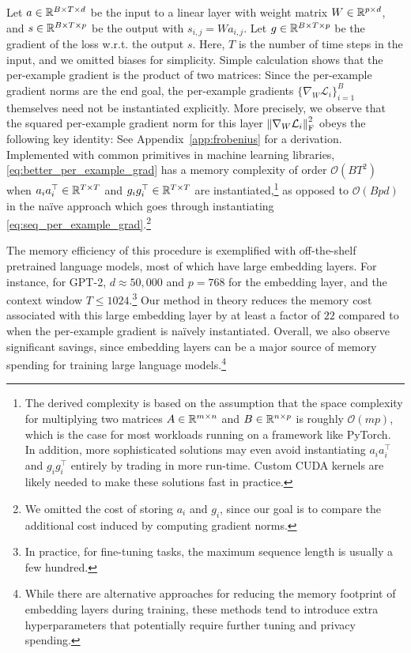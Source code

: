 Let $a \in \mathbb{R}^{B\times T \times d}$ be the input to a linear layer with weight matrix $W \in \mathbb{R}^{p \times d}$, and $s \in \mathbb{R}^{B \times T \times p}$ be the output with $s_{i, j} = W a_{i, j}$. Let $g \in \mathbb{R}^{B \times T \times p}$ be the gradient of the loss w.r.t. the output $s$. 
Here, $T$ is the number of time steps in the input, and we omitted biases for simplicity. 
Simple calculation shows that the per-example gradient is the product of two matrices:
Since the per-example gradient norms are the end goal, the per-example gradients $\{\nabla_W \mathcal{L}_i\}_{i=1}^B$ themselves need not be instantiated explicitly. 
More precisely, we observe that the squared per-example gradient norm for this layer $\left\lVert\nabla_{W} \mathcal{L}_i\right\rVert_{\mathrm{F}}^2$ obeys the following key identity:
See Appendix~\ref{app:frobenius} for a derivation. 
Implemented with common primitives in machine learning libraries, \eqref{eq:better_per_example_grad} has a memory complexity of order $\mathcal{O}(BT^2)$ when $a_{i} a_{i}^\top\in\mathbb{R}^{T\times T}$ and $g_{i} g_{i}^\top\in\mathbb{R}^{T\times T}$ are instantiated,\footnote{The derived complexity is based on the assumption that the space complexity for multiplying two matrices $A\in \mathbb{R}^{m\times n}$ and $B\in \mathbb{R}^{n\times p}$ is roughly $\mathcal{O}(mp)$, which is the case for most workloads running on a framework like PyTorch. 
In addition, more sophisticated solutions may even avoid instantiating $a_{i} a_{i}^\top$ and $g_{i} g_{i}^\top$ entirely by trading in more run-time. Custom CUDA kernels are likely needed to make these solutions fast in practice.
} as opposed to $\mathcal{O}(Bpd)$ in the na\"ive approach which goes through instantiating \eqref{eq:seq_per_example_grad}.\footnote{We omitted the cost of storing $a_i$ and $g_i$, since our goal is to compare the additional cost induced by computing gradient norms.}

The memory efficiency of this procedure is exemplified with off-the-shelf pretrained language models, most of which have large embedding layers. 
For instance, for GPT-2, $d\approx50,000$ and $p=768$ for the embedding layer, and the context window $T\le 1024$.\footnote{In practice, for fine-tuning tasks, the maximum sequence length is usually a few hundred. } 
Our method in theory reduces the memory cost associated with this large embedding layer by at least a factor of $22$ compared to when the per-example gradient is na\"ively instantiated.
Overall, we also observe significant savings, since embedding layers can be a major source of memory spending for training large language models.\footnote{While there are alternative approaches for reducing the memory footprint of embedding layers during training,  
these methods tend to introduce extra hyperparameters that potentially require further tuning and privacy spending.
}

